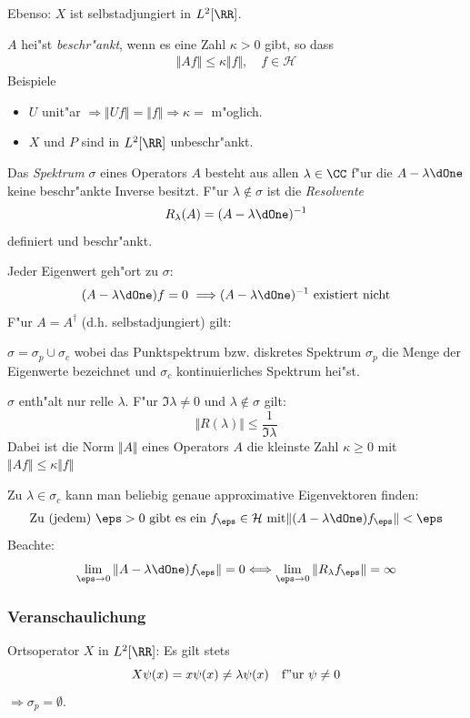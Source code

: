 \documentclass[a4paper]{scrartcl}
\begin{document}
{Ebenso: $X$ ist selbstadjungiert in $L^2[\RR]$.

$A$ hei"st \emph{beschr"ankt}, wenn es eine Zahl $\kappa > 0$ gibt, so dass
\begin{align}
\Vert A f \Vert \leq \kappa \Vert f \Vert, \quad f \in \mathcal H
\end{align}
Beispiele
\begin{itemize}
\item $U$ unit"ar $\Longrightarrow \Vert Uf \Vert = \Vert f \Vert \Rightarrow \kappa =$ m"oglich.
\item $X$ und $P$ sind in $L^2[\RR]$ unbeschr"ankt.
\end{itemize}
Das \emph{Spektrum $\sigma$} eines Operators $A$ besteht aus allen $\lambda \in \CC$ f"ur die $A - \lambda \dOne$ keine beschr"ankte Inverse besitzt. F"ur $\lambda \notin \sigma$ ist die \emph{Resolvente}
\begin{align}
R_\lambda(A) = (A - \lambda \dOne)^{-1}
\end{align}
definiert und beschr"ankt.

Jeder Eigenwert geh"ort zu $\sigma$:
$$(A-\lambda \dOne) f = 0 \ \Longrightarrow (A-\lambda \dOne)^{-1} \mathrm{ \ existiert \ nicht}$$
F"ur $A = A^\dagger$ (d.h. selbstadjungiert) gilt:
\begin{1aufz}
\item $\sigma = \sigma_p \cup \sigma_c$ wobei das Punktspektrum bzw. diskretes Spektrum $\sigma_p$ die Menge der Eigenwerte bezeichnet und $\sigma_c$ kontinuierliches Spektrum hei"st.
\item $\sigma$ enth"alt nur relle $\lambda$. F"ur $\Im \lambda \neq 0$ und $\lambda \notin \sigma$ gilt:
$$\Vert R(\lambda) \Vert \leq \frac 1 {\Im \lambda}$$
Dabei ist die Norm $\Vert A \Vert$ eines Operators $A$ die kleinste Zahl $\kappa \geq 0$ mit $\Vert Af \Vert \leq \kappa \Vert f \Vert$
\item Zu $\lambda \in \sigma_c$ kann man beliebig genaue approximative Eigenvektoren finden:
\begin{align}
\mathrm{Zu \ (jedem) \ } \eps>0 \mathrm{ \ gibt \ es \ ein \ } f_\eps \in \mathcal H \mathrm{ \ mit } \Vert (A-\lambda\dOne) f_\eps \Vert < \eps
\end{align}
Beachte:
$$\lim_{\eps \rightarrow 0} \Vert A - \lambda \dOne) f_\eps \Vert = 0 \Longleftrightarrow \lim_{\eps \rightarrow 0} \Vert R_\lambda f_\eps \Vert = \infty$$
\end{1aufz}

\subsubsection*{Veranschaulichung}
\begin{1aufz}
\item Ortsoperator $X$ in $L^2[\RR]$: Es gilt stets
$$ X \psi(x) = x \psi(x) \neq \lambda \psi(x) \quad \mathrm{f"ur \ } \psi \neq 0$$
$\Longrightarrow \sigma_p = \emptyset$.


\end{1aufz}}
\end{document}
